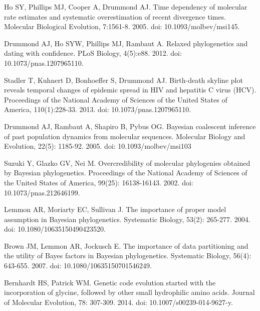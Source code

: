 \documentclass[10pt,letterpaper]{article}
\begin{document}
\begin{thebibliography}{10}
Ho SY, Phillips MJ, Cooper A, Drummond AJ.
\newblock Time dependency of molecular rate estimates and systematic overestimation of recent divergence times.
\newblock Molecular Biological Evolution, 7:1561-8. 2005. doi: 10.1093/molbev/msi145.

Drummond AJ, Ho SYW, Phillips MJ, Rambaut A.
\newblock Relaxed phylogenetics and dating with confidence.
\newblock PLoS Biology, 4(5):e88. 2012. doi: 10.1073/pnas.1207965110.

Stadler T, Kuhnert D, Bonhoeffer S, Drummond AJ.
\newblock Birth-death skyline plot reveals temporal changes of epidemic spread in HIV and hepatitis C virus (HCV).
\newblock Proceedings of the National Academy of Sciences of the United States of America, 110(1):228-33. 2013. doi: 10.1073/pnas.1207965110.

Drummond AJ, Rambaut A, Shapiro B, Pybus OG.
\newblock Bayesian coalescent inference of past population dynamics from molecular sequences.
\newblock Molecular Biology and Evolution, 22(5): 1185-92. 2005. doi: 10.1093/molbev/msi103



Suzuki Y, Glazko GV, Nei M.
\newblock Overcredibility of molecular phylogenies obtained by Bayesian phylogenetics.
\newblock Proceedings of the National Academy of Sciences of the United States of America, 99(25): 16138-16143. 2002. doi: 10.1073/pnas.212646199.

Lemmon AR, Moriarty EC, Sullivan J.
\newblock The importance of proper model assumption in Bayesian phylogenetics.
\newblock Systematic Biology, 53(2): 265-277. 2004. doi: 10.1080/10635150490423520.

Brown JM, Lemmon AR, Jockusch E.
\newblock The importance of data partitioning and the utility of Bayes factors in Bayesian phylogenetics.
\newblock Systematic Biology, 56(4): 643-655. 2007. doi: 10.1080/10635150701546249.


Bernhardt HS, Patrick WM.
\newblock Genetic code evolution started with the incorporation of glycine, followed by other small hydrophilic amino acids.
\newblock Journal of Molecular Evolution, 78: 307-309. 2014. doi: 10.1007/s00239-014-9627-y.

\end{thebibliography}
\end{document}
